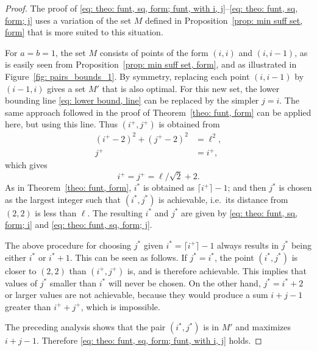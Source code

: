 \documentclass[12pt, a4paper]{article}
\newcommand{\len}{\ell} %
\newcommand{\isolr}{i^+}
\newcommand{\jsolr}{j^+}
\newcommand{\isoli}{i^\ast}
\newcommand{\jsoli}{j^\ast}
\newcommand{\mss}{M}
\begin{document}
\begin{proof}
The proof of \eqref{eq: theo: funt, sq, form; funt, with i, j}--\eqref{eq: theo: funt, sq, form; j}
uses a variation of the set $\mss$ defined in Proposition~\ref{prop: min suff set, form} that is more suited to this situation.

For $a=b=1$, the set $\mss$ consists of points of the form $(i,i)$ and $(i,i-1)$, as is easily seen from Proposition~\ref{prop: min suff set, form}, and as illustrated in Figure~\ref{fig: pairs_bounds_1}. By symmetry, replacing each point $(i,i-1)$ by $(i-1,i)$ gives a set $\mss'$ that is also optimal. For this new set, the lower bounding line \eqref{eq: lower bound, line} can be replaced by the simpler $j=i$. The same approach followed in the proof of Theorem~\ref{theo: funt, form} can be applied here, but using this line. Thus $(\isolr, \jsolr)$ is obtained from
\begin{align}
(\isolr-2)^2 + (\jsolr-2)^2  &= \len^2, \\
\jsolr &= \isolr,
\end{align}
which gives
\begin{equation}
\label{eq: theo: funt, sq, form; proof 1}
\isolr = \jsolr = \len/\sqrt{2} + 2.
\end{equation}
As in Theorem~\ref{theo: funt, form}, $\isoli$ is obtained as $\lceil \isolr \rceil-1$; and then $\jsoli$ is chosen as the largest integer such that $(\isoli, \jsoli)$ is achievable, i.e.~its distance from $(2, 2)$ is less than $\len$. The resulting $\isoli$ and $\jsoli$ are given by \eqref{eq: theo: funt, sq, form; i} and \eqref{eq: theo: funt, sq, form; j}.

The above procedure for choosing $\jsoli$ given $\isoli = \lceil \isolr \rceil-1$ always results in $\jsoli$ being either $\isoli$ or $\isoli+1$. This can be seen as follows. If $\jsoli = \isoli$, the point $(\isoli, \jsoli)$ is closer to $(2,2)$ than $(\isolr, \jsolr)$ is, and is therefore achievable. This implies that values of $\jsoli$ smaller than $\isoli$ will never be chosen. On the other hand, $\jsoli = \isoli+2$ or larger values are not achievable, because they would produce a sum $i+j-1$ greater than $\isolr+\jsolr$, which is impossible.

The preceding analysis shows that the pair $(\isoli,\jsoli)$ is in $\mss'$ and maximizes $i+j-1$. Therefore \eqref{eq: theo: funt, sq, form; funt, with i, j} holds.


\end{proof}
\end{document}
